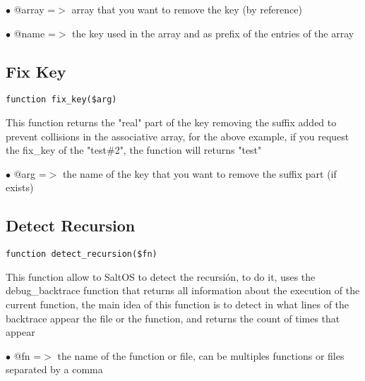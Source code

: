 \documentclass[a4paper]{book}
\begin{document}
\begin{compactitem}
\item[\color{myblue}$\bullet$] @array =$>$ array that you want to remove the key (by reference)
\item[\color{myblue}$\bullet$] @name  =$>$ the key used in the array and as prefix of the entries of the array
\end{compactitem}

\hypertarget{toc296}{}
\subsection{Fix Key}

\begin{lstlisting}
function fix_key($arg)
\end{lstlisting}

This function returns the "real" part of the key removing the suffix added to
prevent collisions in the associative array, for the above example, if you request
the fix\_key of the "test\#2", the function will returns "test"

\begin{compactitem}
\item[\color{myblue}$\bullet$] @arg =$>$ the name of the key that you want to remove the suffix part (if exists)
\end{compactitem}

\hypertarget{toc297}{}
\subsection{Detect Recursion}

\begin{lstlisting}
function detect_recursion($fn)
\end{lstlisting}

This function allow to SaltOS to detect the recursión, to do it, uses the debug\_backtrace
function that returns all information about the execution of the current function, the
main idea of this function is to detect in what lines of the backtrace appear the file
or the function, and returns the count of times that appear

\begin{compactitem}
\item[\color{myblue}$\bullet$] @fn =$>$ the name of the function or file, can be multiples functions or files separated
       by a comma
\end{compactitem}

\hypertarget{toc298}{}
\end{document}
